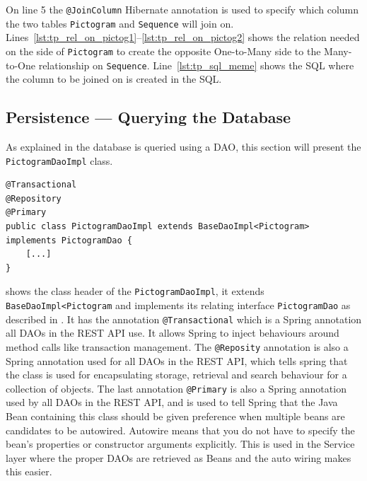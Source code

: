 On line 5 the \texttt{@JoinColumn} Hibernate annotation is used to specify which column the two tables \texttt{Pictogram} and \texttt{Sequence} will join on.
Lines~\ref{lst:tp_rel_on_pictog1}--\ref{lst:tp_rel_on_pictog2} shows the relation needed on the side of \texttt{Pictogram} to create the opposite One-to-Many side to the Many-to-One relationship on \texttt{Sequence}.
Line~\ref{lst:tp_sql_meme} shows the SQL where the column to be joined on is created in the SQL.

\subsection{Persistence --- Querying the Database}
As explained in  the database is queried using a DAO, this section will present the \texttt{PictogramDaoImpl} class.

\begin{lstlisting}[float, floatplacement=h, caption={The class header of the \texttt{PictogramDao}, along with its annotations. \texttt{[...]} denotes omitted code.},label={lst:pictogramDaoImpl}]
@Transactional
@Repository
@Primary
public class PictogramDaoImpl extends BaseDaoImpl<Pictogram> implements PictogramDao {
	[...]
}
\end{lstlisting}

 shows the class header of the \texttt{PictogramDaoImpl}, it extends \texttt{BaseDaoImpl<Pictogram} and implements its relating interface \texttt{PictogramDao} as described in .
It has the annotation \texttt{@Transactional} which is a Spring annotation all DAOs in the REST API use.
It allows Spring to inject behaviours around method calls like transaction management.
The \texttt{@Reposity} annotation is also a Spring annotation used for all DAOs in the REST API, which tells spring that the class is used for encapsulating storage, retrieval and search behaviour for a collection of objects.
The last annotation \texttt{@Primary} is also a Spring annotation used by all DAOs in the REST API, and is used to tell Spring that the Java Bean containing this class should be given preference when multiple beans are candidates to be autowired.
Autowire means that you do not have to specify the bean's properties or constructor arguments explicitly.
This is used in the Service layer where the proper DAOs are retrieved as Beans and the auto wiring makes this easier.

